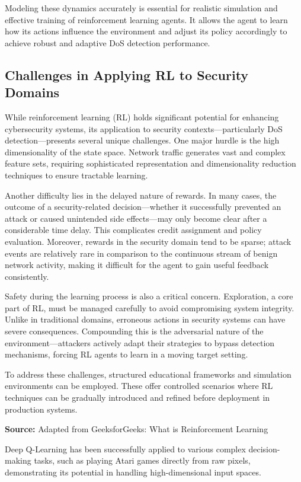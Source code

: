 \documentclass[12pt]{report}
\begin{document}
Modeling these dynamics accurately is essential for realistic simulation and effective training of reinforcement learning agents. It allows the agent to learn how its actions influence the environment and adjust its policy accordingly to achieve robust and adaptive DoS detection performance.



\subsection{Challenges in Applying RL to Security Domains}

While reinforcement learning (RL) holds significant potential for enhancing cybersecurity systems, its application to security contexts—particularly DoS detection—presents several unique challenges. One major hurdle is the high dimensionality of the state space. Network traffic generates vast and complex feature sets, requiring sophisticated representation and dimensionality reduction techniques to ensure tractable learning. 

Another difficulty lies in the delayed nature of rewards. In many cases, the outcome of a security-related decision—whether it successfully prevented an attack or caused unintended side effects—may only become clear after a considerable time delay. This complicates credit assignment and policy evaluation. Moreover, rewards in the security domain tend to be sparse; attack events are relatively rare in comparison to the continuous stream of benign network activity, making it difficult for the agent to gain useful feedback consistently.

Safety during the learning process is also a critical concern. Exploration, a core part of RL, must be managed carefully to avoid compromising system integrity. Unlike in traditional domains, erroneous actions in security systems can have severe consequences. Compounding this is the adversarial nature of the environment—attackers actively adapt their strategies to bypass detection mechanisms, forcing RL agents to learn in a moving target setting.

To address these challenges, structured educational frameworks and simulation environments can be employed. These offer controlled scenarios where RL techniques can be gradually introduced and refined before deployment in production systems.


\noindent\textbf{Source:} Adapted from GeeksforGeeks: What is Reinforcement Learning


Deep Q-Learning has been successfully applied to various complex decision-making tasks, such as playing Atari games directly from raw pixels, demonstrating its potential in handling high-dimensional input spaces.
\end{document}

